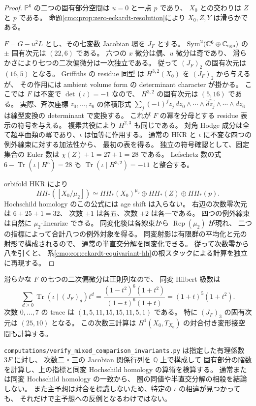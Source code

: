 \begin{proof}
$\mathbb P^6$ の二つの固有部分空間は $u=0$ と一点 $p$ であり、
$X_0$ との交わりは $Z$ と $p$ である。
命題\ref{cmo:prop:zero-eckardt-resolution}により $X_0,Z,Y$ は滑らかである。

$F=G-u^2L$ とし、その七変数 Jacobian 環を $J_F$ とする。
$\operatorname{Sym}^2(\mathbb C^6\oplus\mathbb C_{\mathrm{sgn}})$ の
$\pm$ 固有次元は $(22,6)$ である。
六つの $x$ 微分は偶、$u$ 微分は奇であり、
滑らかさにより七つの二次偏微分は一次独立である。
従って $(J_F)_2$ の固有次元は $(16,5)$ となる。
Griffiths の residue 同型
\cite[Chapter~1, Theorem~4.21]{CMOHuybrechtsCubics}
は $H^{3,2}(X_0)$ を $(J_F)_2$ から与えるが、
その作用には ambient volume form の determinant character が掛かる。
ここでは $F$ は不変で $\det(\iota)=-1$ なので、
$H^{3,2}$ の固有次元は $(5,16)$ である。
実際、斉次座標 $z_0,\ldots,z_6$ の体積形式
$\sum_j(-1)^jz_j\,dz_0\wedge\cdots\wedge\widehat{dz_j}\wedge\cdots\wedge dz_6$
は線型変換の determinant で変換する。
これが $F$ の冪を分母とする residue 表示の符号を与える。
複素共役により $H^{2,3}$ も同じである。
対角 Hodge 成分は全て超平面類の冪であり、$\iota$ は恒等に作用する。
通常の HKR と $\iota$ に不変な四つの例外線束に対する加法性から、
最初の表を得る。
独立の符号確認として、固定集合の Euler 数は
$\chi(Z)+1=27+1=28$ である。
Lefschetz 数の式
$6-\operatorname{Tr}(\iota\mid H^5)=28$ も
$\operatorname{Tr}(\iota\mid H^{3,2})=-11$ と整合する。

orbifold HKR \cite[Corollary~1.17(2)]{CMOOrbifoldHKR}により
\[
 HH_*([X_0/\mu_2])
 \simeq HH_*(X_0)^{\mu_2}\oplus HH_*(Z)\oplus HH_*(p).
\]
Hochschild homology のこの公式には age shift は入らない。
右辺の次数零次元は $6+25+1=32$、
次数 $\pm1$ は各五、次数 $\pm2$ は各一である。
四つの例外線束は自然に $\mu_2$-linearize できる。
同変化後は各線束から $\operatorname{Rep}(\mu_2)$ が現れ、
二つの指標によって合計八つの例外対象を得る。
同変射影は有限群の平均化と元の射影で構成されるので、
通常の半直交分解を同変化できる。
従って次数零から八を引くと、
系\ref{cmo:cor:eckardt-equivariant-hh}の根スタックによる計算を独立に再現する。

\end{proof}

\begin{remark}
滑らかな $F$ の七つの二次偏微分は正則列なので、
同変 Hilbert 級数は
\[
 \sum_{d\ge0}\operatorname{Tr}(\iota\mid(J_F)_d)t^d
 =
 \frac{(1-t^2)^6(1+t^2)}{(1-t)^6(1+t)}
 =(1+t)^5(1+t^2).
\]
次数 $0,\ldots,7$ の trace は
$(1,5,11,15,15,11,5,1)$ である。
特に $(J_F)_3$ の固有次元は $(25,10)$ となる。
この次数三計算は $H^1(X_0,T_{X_0})$ の対合付き変形接空間も計算する。


\texttt{computations/verify\_mixed\_comparison\_invariants.py} は指定した有理係数 $3F$ に対し、
次数二・三の Jacobian 関係行列を $\mathbb Q$ 上で構成して
固有部分の階数を計算し、上の指標と同変 Hochschild homology の算術を検算する。
通常または同変 Hochschild homology の一致から、
圏の同値や半直交分解の相殺を結論しない。
また主予想は対合を標識しないため、特定の $\iota$ の相違が見つかっても、
それだけで主予想への反例となるわけではない。
\end{remark}

